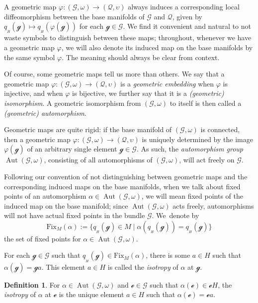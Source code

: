 \documentclass[pdftex]{sigma}
\numberwithin{equation}{section}
\theoremstyle{definition}
\newtheorem{Definition}[Theorem]{Definition}
\DeclareMathOperator{\Aut}{\mathrm{Aut}}
\begin{document}
A geometric map $\varphi\colon (\mathscr{G},\omega)\to (\mathscr{Q},\upsilon)$ always induces a corresponding local diffeomorphism between the base manifolds of $\mathscr{G}$ and $\mathscr{Q}$, given by $q_{{}_H}(\mathscr{g})\mapsto q_{{}_H}(\varphi(\mathscr{g}))$ for each $\mathscr{g}\in\mathscr{G}$. We find it convenient and natural to not waste symbols to distinguish between these maps; throughout, whenever we have a geometric map $\varphi$, we will also denote its induced map on the base manifolds by the same symbol $\varphi$. The meaning should always be clear from context.

Of course, some geometric maps tell us more than others. We say that a geometric map $\varphi\colon (\mathscr{G},\omega)\to (\mathscr{Q},\upsilon)$ is a \emph{geometric embedding} when $\varphi$ is injective, and when $\varphi$ is bijective, we further say that it is a \emph{(geometric) isomorphism}. A geometric isomorphism from $(\mathscr{G},\omega)$ to itself is then called a \emph{(geometric) automorphism}.

Geometric maps are quite rigid: if the base manifold of $(\mathscr{G},\omega)$ is connected, then a geometric map $\varphi\colon (\mathscr{G},\omega)\to(\mathscr{Q},\upsilon)$ is uniquely determined by the image $\varphi(\mathscr{g})$ of an arbitrary single element $\mathscr{g}\in\mathscr{G}$. As such, the \emph{automorphism group} $\Aut(\mathscr{G},\omega)$, consisting of all automorphisms of $(\mathscr{G},\omega)$, will act freely on $\mathscr{G}$.

Following our convention of not distinguishing between geometric maps and the corresponding induced maps on the base manifolds, when we talk about fixed points of an automorphism $\alpha\in\Aut(\mathscr{G},\omega)$, we will mean fixed points of the induced map on the base manifold; since $\Aut(\mathscr{G},\omega)$ acts freely, automorphisms will not have actual fixed points in the bundle $\mathscr{G}$. We~denote by \[\mathrm{Fix}_M(\alpha):=\{q_{{}_H}(\mathscr{g})\in M \mid \alpha(q_{{}_H}(\mathscr{g}))=q_{{}_H}(\mathscr{g})\}\] the set of fixed points for $\alpha\in\Aut(\mathscr{G},\omega)$.

For each $\mathscr{g}\in\mathscr{G}$ such that $q_{{}_H}(\mathscr{g})\in\mathrm{Fix}_M(\alpha)$, there is some $a\in H$ such that $\alpha(\mathscr{g})=\mathscr{g}a$. This element $a\in H$ is called the \emph{isotropy} of $\alpha$ at $\mathscr{g}$.

\begin{Definition}For $\alpha\in\Aut(\mathscr{G},\omega)$ and $\mathscr{e}\in\mathscr{G}$ such that $\alpha(\mathscr{e})\in\mathscr{e}H$, the \emph{isotropy} of $\alpha$ at $\mathscr{e}$ is the unique element $a\in H$ such that $\alpha(\mathscr{e})=\mathscr{e}a$.\end{Definition}
\end{document}
